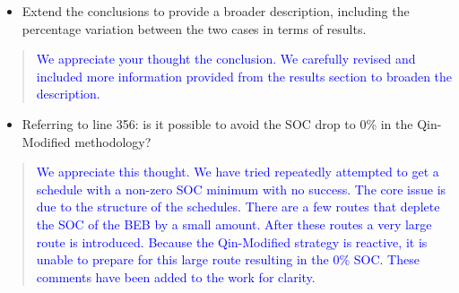 \documentclass[11pt,a4paper,final]{article}
\begin{document}
\begin{itemize}
\item Extend the conclusions to provide a broader description, including the percentage variation between the two cases in terms of results.
\end{itemize}

\begin{quote}
  \textcolor{blue}{We appreciate your thought the conclusion. We carefully revised and included more information provided from the results section to broaden the description.}
\end{quote}

\begin{itemize}
\item Referring to line 356: is it possible to avoid the SOC drop to 0\% in the Qin-Modified methodology?
\end{itemize}

\begin{quote}
  \textcolor{blue}{We appreciate this thought. We have tried repeatedly attempted to get a schedule with a non-zero SOC minimum with no success. The core issue is due to the structure of the schedules. There are a few routes that deplete the SOC of the BEB by a small amount. After these routes a very large route is introduced. Because the Qin-Modified strategy is reactive, it is unable to prepare for this large route resulting in the 0\% SOC. These comments have been added to the work for clarity.}
\end{quote}
\end{document}
